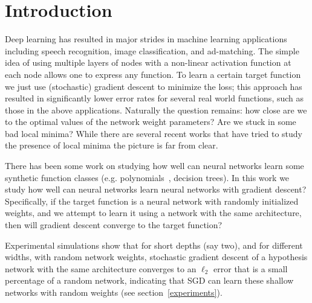 \section{Introduction}


Deep learning has resulted in major strides in machine learning applications including speech recognition, image classification, and ad-matching. The simple idea of using multiple layers of nodes with a non-linear activation function at each node allows one to express any function.  To learn a certain target function we just use (stochastic) gradient descent to minimize the loss; this approach has resulted in significantly lower error rates for several real world functions, such as those in the above applications. Naturally the question remains: how close are we to the optimal values of the network weight parameters? Are we stuck in some bad local minima? While there are several recent works \cite{ChoromanskaHMAL14, DauphinPGCGB14, Kawaguchi16a} that have tried to study the presence of local minima the picture is far from clear.

There has been some work on studying how well can neural networks learn some synthetic function classes (e.g. polynomials~\cite{valiant2014learning}, decision trees). 
In this work we study how well can neural networks learn neural networks with gradient descent?
%
%
 Specifically, if the target function is a neural network with randomly initialized weights, and we attempt to learn it using a network with the same architecture, then will gradient descent converge to the target function?





Experimental simulations show that for short depths (say two), and for different widths, with random network weights, stochastic gradient descent of a hypothesis network with the same architecture converges to an $\ell_2$ error that is a small percentage of a random network, indicating that SGD can learn these shallow networks with random weights (see section~\ref{experiments}). 

